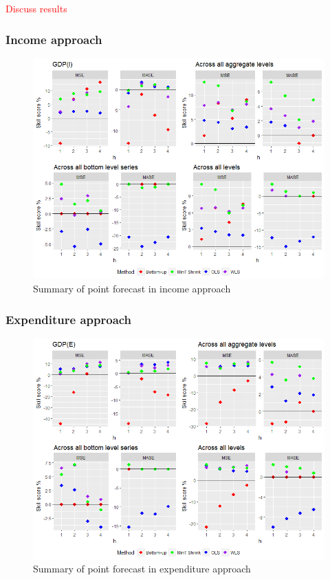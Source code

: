 \documentclass[graybox]{svmult}
\begin{document}
\textcolor{red}{Discuss results}

\subsubsection*{Income approach}

\begin{figure}[H]
	\centering
	\small
	\includegraphics[scale=0.50]{Figs/Results/INC-PointF.PNG}
	\caption{Summary of point forecast in income approach}\label{Exp-PointF}
\end{figure}


\subsubsection*{Expenditure approach}

\begin{figure}[H]
	\centering
	\small
	\includegraphics[scale=0.50]{Figs/Results/EXP-PointF.PNG}
	\caption{Summary of point forecast in expenditure approach}\label{Inc-PointF}
\end{figure}
\end{document}

